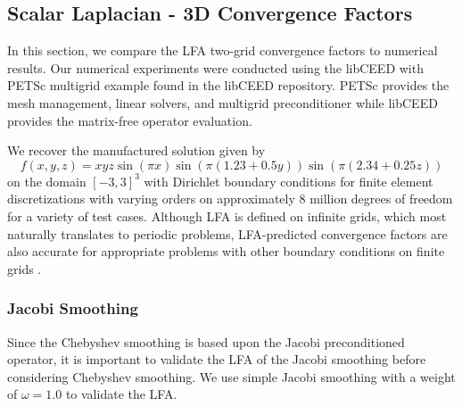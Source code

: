 \documentclass[review]{siamart190516}
\begin{document}
\subsection{Scalar Laplacian - 3D Convergence Factors}\label{sec:3dresults}

In this section, we compare the LFA two-grid convergence factors to numerical results.
Our numerical experiments were conducted using the libCEED \cite{libceed-user-manual} with PETSc \cite{petsc-user-ref} multigrid example found in the libCEED repository.
PETSc provides the mesh management, linear solvers, and multigrid preconditioner while libCEED provides the matrix-free operator evaluation.

We recover the manufactured solution given by
\begin{equation}
f \left( x, y, z \right) = x y z \sin \left( \pi x \right) \sin \left( \pi \left( 1.23 + 0.5 y \right) \right) \sin \left( \pi \left( 2.34 + 0.25 z \right) \right)
\end{equation}
on the domain $\left[ -3, 3 \right]^3$ with Dirichlet boundary conditions for finite element discretizations with varying orders on approximately 8 million degrees of freedom for a variety of test cases.
Although LFA is defined on infinite grids, which most naturally translates to periodic problems, LFA-predicted convergence factors are also accurate for appropriate problems with other boundary conditions on finite grids \cite{rodrigo2019validity}.

\subsubsection{Jacobi Smoothing}

Since the Chebyshev smoothing is based upon the Jacobi preconditioned operator, it is important to validate the LFA of the Jacobi smoothing before considering Chebyshev smoothing.
We use simple Jacobi smoothing with a weight of $\omega = 1.0$ to validate the LFA.
\end{document}
